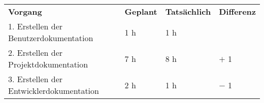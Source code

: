 \begin{tabular}{llll}
\rowcolor{heading}\textbf{Vorgang} & \textbf{Geplant} & \textbf{Tatsächlich} & \textbf{Differenz} \\
1. Erstellen der Benutzerdokumentation & 1 h   & 1 h   &  \\
\rowcolor{odd}2. Erstellen der Projektdokumentation & 7 h   & 8 h   & $+$ 1\\
3. Erstellen der Entwicklerdokumentation & 2 h   & 1 h   &  $-$ 1\\
\end{tabular}
